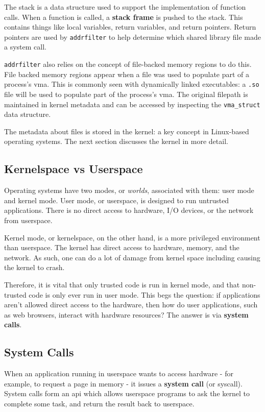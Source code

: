 The stack is a data structure used to support the implementation of function
calls. When a function is called, a \textbf{stack frame} is pushed to the
stack. This contains things like local variables, return variables, and
return pointers. Return pointers are used by \texttt{addrfilter} to help
determine which shared library file made a system call.

\texttt{addrfilter} also relies on the concept of file-backed memory regions 
to do this. File backed memory regions appear when a file was used to populate
part of a process's \ac{vma}. This is commonly seen with dynamically linked
executables: a \texttt{.so} file will be used to populate part of the
process's \ac{vma}. The original filepath is maintained in kernel metadata and
can be accessed by inspecting the \texttt{vma\_struct} data structure.

The metadata about files is stored in the kernel: a key concept in Linux-based
operating systems. The next section discusses the kernel in more detail.

\subsection{Kernelspace vs Userspace}
Operating systems have two modes, or \textit{worlds}, associated with them: user
mode and kernel mode. User mode, or userspace, is designed to run untrusted 
applications. There is no direct access to hardware, I/O devices, or the 
network from userspace.

Kernel mode, or kernelspace, on the other hand, is a more privileged environment
than userspace. The kernel has direct access to hardware, memory, and the
network. As such, one can do a lot of damage from kernel space including causing
the kernel to crash.

Therefore, it is vital that only trusted code is run in kernel mode, and that
non-trusted code is only ever run in user mode. This begs the question: if
applications aren't allowed direct access to the hardware, then how do user
applications, such as web browsers, interact with hardware resources? The answer
is via \textbf{system calls}.

\subsection{System Calls}

When an application running in userspace wants to access hardware - for example,
to request a page in memory - it issues a \textbf{system call} (or syscall). System calls
form an \ac{api} which allows userspace programs to ask the kernel to complete some
task, and return the result back to userspace.


